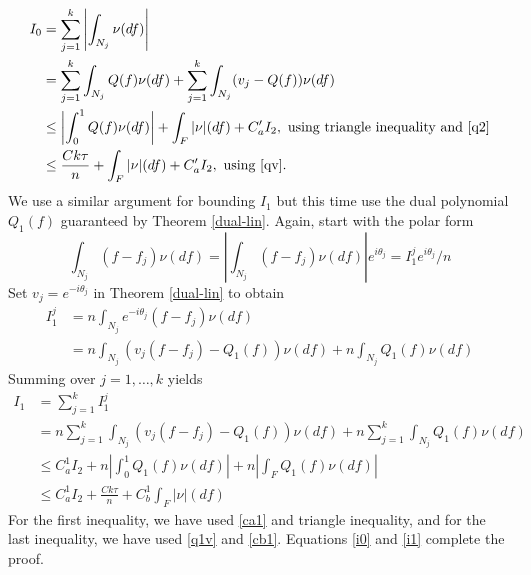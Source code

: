\begin{align}
\nonumber I_0 &= \sum_{j=1}^k \left| \int_{N_j} \nu(df) \right|\\
\nonumber & = \sum_{j=1}^k\int_{N_j} Q ( f) \nu ( d f) + 
\sum_{j=1}^k \int_{N_j} ( v_j - Q ( f)) \nu ( d f)\\
\nonumber & \leq \left|\int_0^1 Q(f) \nu(df) \right| + \int_F|\nu|(df) + C_a' I_2, \text{ using triangle inequality and \eqref{q2}}\\
\label{i0} & \leq \frac{C k \tau}{n} + \int_F|\nu|(df) + C_a' I_2, \text{ using \eqref{qv}}.
\end{align}
We use a similar argument for bounding $I_1$ but this time use the dual polynomial $Q_1(f)$ guaranteed by Theorem \ref{dual-lin}. Again, start with the polar form
\[
  \int_{N_j} (f - f_j) \nu ( d f)  =  \left|
  \int_{N_j} (f - f_j) \nu ( d f) \right| e^{i \theta_j} = I_1^j e^{i\theta_j}/n
\]
Set $v_j = e^{-i \theta_j}$ in Theorem \ref{dual-lin} to obtain
{
\begin{align*}
  I_1^j & = 
  n\int_{N_j} e^{- i \theta_j} ( f - f_j) \nu ( d f)\\
  & =  n \int_{N_j} (v_j (
  f - f_j) - Q_1 ( f)) \nu ( d f)  + n\int_{N_j} Q_1 ( f) \nu ( d f)
\end{align*}
}
Summing over $j=1,\ldots,k$ yields
{
\begin{align}
\nonumber I_1 &= \sum_{j=1}^k I_1^j\\
\nonumber &= n \sum_{j=1}^k \int_{N_j} (v_j (
  f - f_j) - Q_1 ( f)) \nu ( d f) + n\sum_{j=1}^k\int_{N_j} Q_1 ( f) \nu ( d f)\\
\nonumber &\leq C_a^1 I_2 + n\left|\int_0^1 Q_1(f) \nu(df)\right| +  n\left |\int_F Q_1(f) \nu(df)\right |\\
\label{i1}& \leq C_a^1 I_2 + \frac{C k \tau}{n} +  C_b^1 \int_F|\nu|(df)
\end{align}
}
For the first inequality, we have used \eqref{ca1} and triangle inequality, and for the last inequality, we have used \eqref{q1v} and \eqref{cb1}. Equations \eqref{i0} and \eqref{i1} complete the proof.


